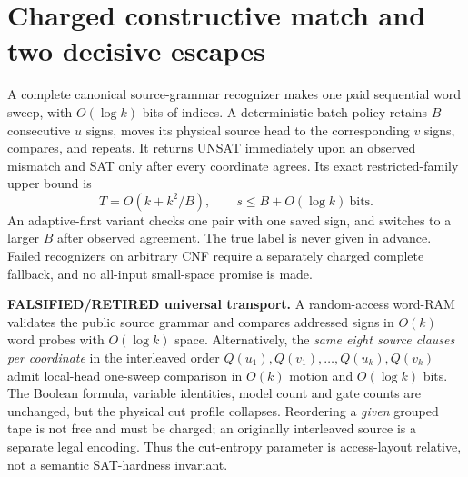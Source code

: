 \documentclass[11pt]{article}
\begin{document}
\section{Charged constructive match and two decisive escapes}
A complete canonical source-grammar recognizer makes one paid sequential word sweep,
with $O(\log k)$ bits of indices. A deterministic batch policy retains $B$ consecutive $u$ signs,
moves its physical source head to the corresponding $v$ signs, compares, and repeats.
It returns UNSAT immediately upon an observed mismatch and SAT only after every coordinate agrees.
Its exact restricted-family upper bound is
\[
T=O(k+k^2/B),\qquad s\le B+O(\log k)\ \text{bits}.
\]
An adaptive-first variant checks one pair with one saved sign, and switches to a larger $B$ after
observed agreement. The true label is never given in advance. Failed recognizers on arbitrary CNF
require a separately charged complete fallback, and no all-input small-space promise is made.

\noindent\textbf{FALSIFIED/RETIRED universal transport.} A random-access word-RAM validates the public source grammar and compares addressed signs in $O(k)$ word probes with $O(\log k)$ space. Alternatively, the \emph{same eight source clauses per coordinate} in the interleaved order $Q(u_1),Q(v_1),\ldots,Q(u_k),Q(v_k)$ admit local-head one-sweep comparison in $O(k)$ motion and $O(\log k)$ bits. The Boolean formula, variable identities, model count and gate counts are unchanged, but the physical cut profile collapses. Reordering a \emph{given} grouped tape is not free and must be charged; an originally interleaved source is a separate legal encoding. Thus the cut-entropy parameter is access-layout relative, not a semantic SAT-hardness invariant.
\end{document}
